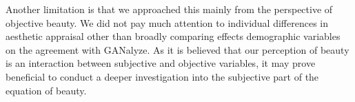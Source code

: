 \documentclass[../main.tex]{subfiles}
\begin{document}
Another limitation is that we approached this mainly from the perspective of objective beauty. We did not pay much attention to individual differences in aesthetic appraisal other than broadly comparing effects demographic variables on the agreement with GANalyze. As it is believed that our perception of beauty is an interaction between subjective and objective variables, it may prove beneficial to conduct a deeper investigation into the subjective part of the equation of beauty.


\end{document}
